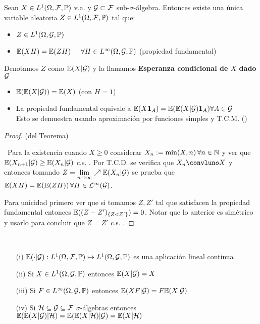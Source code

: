 \begin{theorem}
Sean $X\in L^1(\Omega,\mathcal{F},\mathbb{P})$ v.a. y $\mathcal{G}\subset\mathcal{F}$ sub-$\sigma$-álgebra. Entonces existe una única variable aleatoria $Z\in L^1(\Omega,\mathcal{F},\mathbb{P})$ tal que:
\begin{itemize}
    \item $Z\in L^1(\Omega,\mathcal{G},\mathbb{P})$
    \item $\mathbb{E}(XH)=\mathbb{E}(ZH) \hspace{.5cm} \forall H\in L^\infty(\Omega,\mathcal{G},\mathbb{P})$ \espacio (propiedad fundamental)
\end{itemize}
\end{theorem}
\begin{notation}
Denotamos $Z$  como $\mathbb{E}(X|\mathcal{G})$ y la llamamos \textbf{Esperanza condicional de $X$ %
dado $\mathcal{G}$}
\end{notation}
\begin{remark}
\beforeitemize
\begin{itemize}
    \item $\mathbb{E}(\mathbb{E}(X|\mathcal{G}))=\mathbb{E}(X)$ (con $H=1$)
    \item La propiedad fundamental equivale a $\mathbb{E}(X \mathbf{1}_A)=\mathbb{E}(\mathbb{E}(X|\mathcal{G})\mathbf{1}_A) \forall A\in\mathcal{G}$
    \\ Esto se demuestra usando aproximación por funciones simples y T.C.M. (\ejercicio)
\end{itemize}
\end{remark}
\begin{proof}
(del Teorema)

\ejercicio \gris \, Para la existencia cuando $X\geq0$ considerar $X_n:=\min(X,n) \, \forall n\in\mathbb{N}$ y ver que $\mathbb{E}(X_{n+1}|\mathcal{G})\geq\mathbb{E}(X_n|\mathcal{G})$ c.s. . Por T.C.D. se verifica que $X_n\convluno X$ y entonces tomando $Z=\displaystyle\lim_{n\to\infty}\nearrow\mathbb{E}(X_n|\mathcal{G})$ se prueba que $\mathbb{E}(XH)=\mathbb{E}(\mathbb{E}(ZH))\,\forall H\in \mathcal{L}^\infty(\mathcal{G})$. 

Para unicidad primero ver que si tomamos $Z,Z'$ tal que satisfacen la propiedad fundamental entonces $\mathbb{E}((Z-Z')_{\{Z<Z'\}})=0$. Notar que lo anterior es simétrico y usarlo para concluir que $Z=Z'$ c.s. .
\negro
\end{proof}
\vspace{1cm}\\
\begin{property}
\beforeitemize
\begin{enumerate}
    \item[(i)] $\mathbb{E}(\cdot|\mathcal{G}):L^1(\Omega,\mathcal{F},\mathbb{P})\mapsto L^1(\Omega,\mathcal{G},\mathbb{P})$ es una aplicación lineal continua
    \item[(ii)] Si $X\in L^1(\Omega,\mathcal{G},\mathbb{P})$ entonces $\mathbb{E}(X|\mathcal{G})=X$
    \item[(iii)] Si $F\in L^\infty(\Omega,\mathcal{G},\mathbb{P})$ entonces $\mathbb{E}(XF|\mathcal{G})=F\mathbb{E}(X|\mathcal{G})$
    \item[(iv)] Si $\mathcal{H}\subseteq \mathcal{G}\subseteq\mathcal{F}$ $\sigma$-álgebras entonces
    $ \mathbb{E}(\mathbb{E}(X|\mathcal{G})|\mathcal{H}) = \mathbb{E}(\mathbb{E}(X|\mathcal{H})|\mathcal{G})=\mathbb{E}(X|\mathcal{H})$
\end{enumerate}
\end{property}

